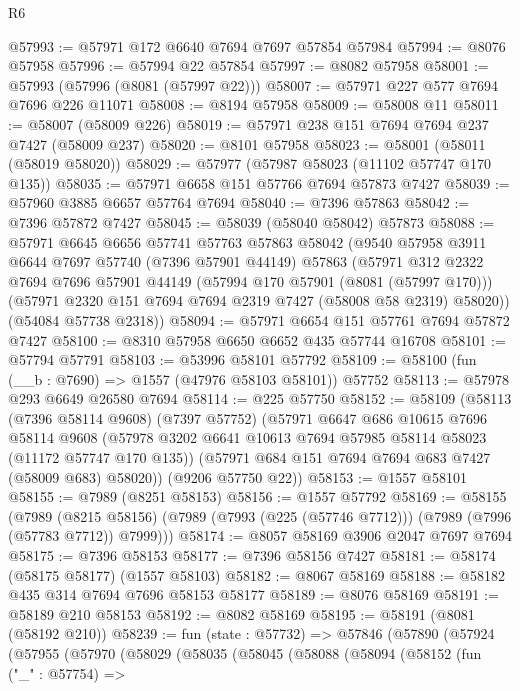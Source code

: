 \begin{lexlean}{R6}
\begin{coremodule}
@57993 := @57971 @172 @6640 @7694 @7697 @57854 @57984
@57994 := @8076 @57958
@57996 := @57994 @22 @57854
@57997 := @8082 @57958
@58001 := @57993 (@57996 (@8081 (@57997 @22)))
@58007 := @57971 @227 @577 @7694 @7696 @226 @11071
@58008 := @8194 @57958
@58009 := @58008 @11
@58011 := @58007 (@58009 @226)
@58019 := @57971 @238 @151 @7694 @7694 @237 @7427 (@58009 @237)
@58020 := @8101 @57958
@58023 := @58001 (@58011 (@58019 @58020))
@58029 := @57977 (@57987 @58023 (@11102 @57747 @170 @135))
@58035 := @57971 @6658 @151 @57766 @7694 @57873 @7427
@58039 := @57960 @3885 @6657 @57764 @7694
@58040 := @7396 @57863
@58042 := @7396 @57872 @7427
@58045 := @58039 (@58040 @58042) @57873
@58088 := @57971
    @6645
    @6656
    @57741
    @57763
    @57863
    @58042
    (@9540
      @57958
      @3911
      @6644
      @7697
      @57740
      (@7396 @57901 @44149)
      @57863
      (@57971
        @312
        @2322
        @7694
        @7696
        @57901
        @44149
        (@57994 @170 @57901 (@8081 (@57997 @170)))
        (@57971 @2320 @151 @7694 @7694 @2319 @7427 (@58008 @58 @2319) @58020))
      (@54084 @57738 @2318))
@58094 := @57971 @6654 @151 @57761 @7694 @57872 @7427
@58100 := @8310 @57958 @6650 @6652 @435 @57744 @16708
@58101 := @57794 @57791
@58103 := @53996 @58101 @57792
@58109 := @58100 (fun (__b : @7690) => @1557 (@47976 @58103 @58101)) @57752
@58113 := @57978 @293 @6649 @26580 @7694
@58114 := @225 @57750
@58152 := @58109
    (@58113
      (@7396 @58114 @9608)
      (@7397 @57752)
      (@57971
        @6647
        @686
        @10615
        @7696
        @58114
        @9608
        (@57978 @3202 @6641 @10613 @7694 @57985 @58114 @58023 (@11172 @57747 @170 @135))
        (@57971 @684 @151 @7694 @7694 @683 @7427 (@58009 @683) @58020))
      (@9206 @57750 @22))
@58153 := @1557 @58101
@58155 := @7989 (@8251 @58153)
@58156 := @1557 @57792
@58169 := @58155
    (@7989
      (@8215 @58156)
      (@7989 (@7993 (@225 (@57746 @7712))) (@7989 (@7996 (@57783 @7712)) @7999)))
@58174 := @8057 @58169 @3906 @2047 @7697 @7694
@58175 := @7396 @58153
@58177 := @7396 @58156 @7427
@58181 := @58174 (@58175 @58177) (@1557 @58103)
@58182 := @8067 @58169
@58188 := @58182 @435 @314 @7694 @7696 @58153 @58177
@58189 := @8076 @58169
@58191 := @58189 @210 @58153
@58192 := @8082 @58169
@58195 := @58191 (@8081 (@58192 @210))
@58239 := fun (state : @57732) =>
  @57846
    (@57890
      (@57924
        (@57955
          (@57970
            (@58029
              (@58035
                (@58045
                  (@58088
                    (@58094
                      (@58152
                        (fun ("_" : @57754) =>

\end{coremodule}
\end{lexlean}
